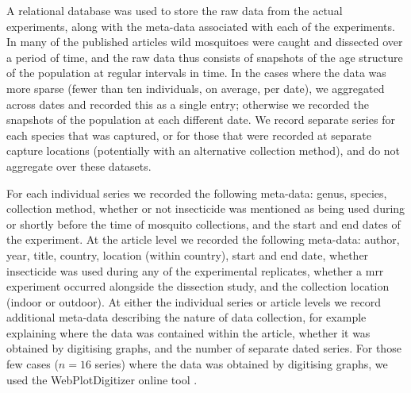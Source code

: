 \documentclass[12pt]{article}
\begin{document}
{A relational database was used to store the raw data from the actual experiments, along with the meta-data associated with each of the experiments. In many of the published articles wild mosquitoes were caught and dissected over a period of time, and the raw data thus consists of snapshots of the age structure of the population at regular intervals in time. In the cases where the data was more sparse (fewer than ten individuals, on average, per date), we aggregated across dates and recorded this as a single entry; otherwise we recorded the snapshots of the population at each different date. We record separate series for each species that was captured, or for those that were recorded at separate capture locations (potentially with an alternative collection method), and do not aggregate over these datasets.

For each individual series we recorded the following meta-data: genus, species, collection method, whether or not insecticide was mentioned as being used during or shortly before the time of mosquito collections, and the start and end dates of the experiment. At the article level we recorded the following meta-data: author, year, title, country, location (within country), start and end date, whether insecticide was used during any of the experimental replicates, whether a mrr experiment occurred alongside the dissection study, and the collection location (indoor or outdoor). At either the individual series or article levels we record additional meta-data describing the nature of data collection, for example explaining where the data was contained within the article, whether it was obtained by digitising graphs, and the number of separate dated series. For those few cases ($n=16$ series) where the data was obtained by digitising graphs, we used the WebPlotDigitizer online tool \citep{digitise}.

}
\end{document}
